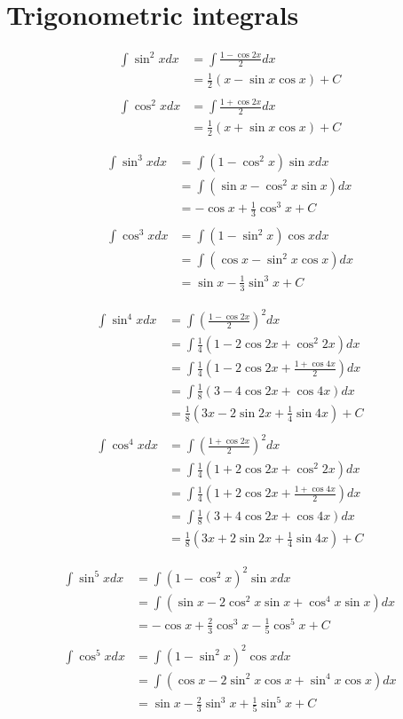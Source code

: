 \documentclass{article}
\begin{document}
\section{Trigonometric integrals}

\begin{align*}
\int \sin^2{x} dx
  &= \int \frac{1-\cos{2x}}{2} dx \\
  &= \frac{1}{2}(x - \sin{x}\cos{x}) + C
\\\\
\int \cos^2{x} dx
  &= \int \frac{1+\cos{2x}}{2} dx \\
  &= \frac{1}{2}(x + \sin{x}\cos{x}) + C
\end{align*}

\begin{align*}
\int \sin^3{x} dx
  &= \int (1 - \cos^2{x})\sin{x} dx \\
  &= \int (\sin{x} - \cos^2{x}\sin{x}) dx \\
  &= -\cos{x} + \frac{1}{3}\cos^3{x} + C
\\\\
\int \cos^3{x} dx
  &= \int (1 - \sin^2{x})\cos{x} dx \\
  &= \int (\cos{x} - \sin^2{x}\cos{x}) dx \\
  &= \sin{x} - \frac{1}{3}\sin^3{x} + C
\end{align*}

\begin{align*}
\int \sin^4{x} dx
  &= \int \left(\frac{1 -\cos{2x}}{2}\right)^2 dx \\
  &= \int \frac{1}{4}(1 - 2\cos{2x} + \cos^2{2x}) dx \\
  &= \int \frac{1}{4}\left(1 - 2\cos{2x} + \frac{1 + \cos{4x}}{2}\right) dx \\
  &= \int \frac{1}{8}(3 - 4\cos{2x} + \cos{4x}) dx \\
  &= \frac{1}{8}\left(3x - 2\sin{2x} + \frac{1}{4}\sin{4x}\right) + C
\\\\
\int \cos^4{x} dx
  &= \int \left(\frac{1 +\cos{2x}}{2}\right)^2 dx \\
  &= \int \frac{1}{4}(1 + 2\cos{2x} + \cos^2{2x}) dx \\
  &= \int \frac{1}{4}\left(1 + 2\cos{2x} + \frac{1 + \cos{4x}}{2}\right) dx \\
  &= \int \frac{1}{8}(3 + 4\cos{2x} + \cos{4x}) dx \\
  &= \frac{1}{8}\left(3x + 2\sin{2x} + \frac{1}{4}\sin{4x}\right) + C
\end{align*}

\begin{align*}
\int \sin^5{x} dx
  &= \int (1 - \cos^2{x})^2\sin{x} dx \\
  &= \int (\sin{x} - 2\cos^2{x}\sin{x} + \cos^4{x}\sin{x}) dx \\
  &= -\cos{x} + \frac{2}{3}\cos^3{x} - \frac{1}{5}\cos^5{x} + C
\\\\
\int \cos^5{x} dx
  &= \int (1 - \sin^2{x})^2\cos{x} dx \\
  &= \int (\cos{x} - 2\sin^2{x}\cos{x} + \sin^4{x}\cos{x}) dx \\
  &= \sin{x} - \frac{2}{3}\sin^3{x} + \frac{1}{5}\sin^5{x} + C
\end{align*}
\end{document}

